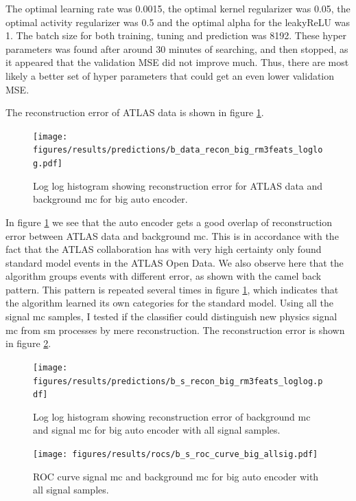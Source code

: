 \documentclass[ reprint, amsmath,amssymb, aps, nofootinbib]{revtex4-2}
\begin{document}
The optimal learning rate was 0.0015, the optimal kernel regularizer was 0.05, the optimal activity regularizer was 0.5 and the optimal alpha for the leakyReLU was 1. The batch size for both training, tuning and prediction was 8192. These hyper parameters was found after around 30 minutes of searching, and then stopped, as it appeared that the validation MSE did not improve much. Thus, there are most likely a better set of hyper parameters that could get an even lower validation MSE. \par 

The reconstruction error of ATLAS data is shown in figure \ref{fig:data_b_big_pred}.

\begin{figure}[H]
     \centering
         \texttt{[image: figures/results/predictions/b\_data\_recon\_big\_rm3feats\_loglog.pdf]}
         \caption{Log log histogram showing reconstruction error for ATLAS data and background mc for big auto encoder. }
     \label{fig:data_b_big_pred}
\end{figure}


In figure \ref{fig:data_b_big_pred} we see that the auto encoder gets a good overlap of reconstruction error between ATLAS data and background mc. This is in accordance with the fact that the ATLAS collaboration has with very high certainty only found standard model events in the ATLAS Open Data. We also observe here that the algorithm groups events with different error, as shown with the camel back pattern. This pattern is repeated several times in figure \ref{fig:data_b_big_pred}, which indicates that the algorithm learned its own categories for the standard model. Using all the signal mc samples, I tested if the classifier could distinguish new physics signal mc from sm processes by mere reconstruction. The reconstruction error is shown in figure \ref{fig:s_b_big_pred_allsig}.


\begin{figure}[H]
     \centering
         \texttt{[image: figures/results/predictions/b\_s\_recon\_big\_rm3feats\_loglog.pdf]}
    \caption{Log log histogram showing reconstruction error of background mc and signal mc for big auto encoder with all signal samples.  }
    \label{fig:s_b_big_pred_allsig}
\end{figure}


\begin{figure}[H]    
    
    \centering
         \texttt{[image: figures/results/rocs/b\_s\_roc\_curve\_big\_allsig.pdf]}
         \caption{ROC curve signal mc and background mc for big auto encoder with all signal samples.}
         \label{fig:s_b_big_roc_allsig}
\end{figure}
\end{document}
